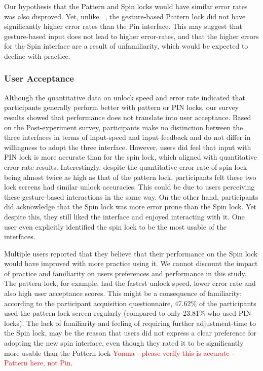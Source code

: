 \documentclass{sigchi}
\newcommand{\comment}[1]{\textcolor{red}{#1}}
\begin{document}
Our hypothesis that the Pattern and Spin locks would have similar error rates was also disproved. Yet, unlike ~\cite{von_zezschwitz_patterns_2013}, the gesture-based Pattern lock did not have significantly higher error rates than the Pin interface. This may suggest that gesture-based input does not lead to higher error-rates, and that the higher errors for the Spin interface are a result of unfamiliarity, which would be expected to decline with practice. 


\subsubsection{User Acceptance}


Although the quantitative data on unlock speed and error rate indicated that participants generally perform better with pattern or PIN locks, our survey results showed that performance does not translate into user acceptance. Based on the Post-experiment survey, participants make no distinction between the three interfaces in terms of input-speed and input feedback and do not differ in willingness to adopt the three interface. However, users did feel that input with PIN lock is more accurate than for the spin lock, which aligned with quantitative error rate results. Interestingly, despite the quantitative error rate of spin lock being almost twice as high as that of the pattern lock, participants felt these two lock screens had similar unlock accuracies. This could be due to users perceiving these gesture-based interactions in the same way. On the other hand, participants did acknowledge that the Spin lock was more error prone than the Spin lock. Yet despite this, they still liked the interface and enjoyed interacting with it. One user even explicitly identified the spin lock to be the most usable of the interfaces. 

Multiple users reported that they believe that their performance on the Spin lock would have improved with more practice using it. We cannot discount the impact of practice and familiarity on users preferences and performance in this study. The pattern lock, for example, had the fastest unlock speed, lower error rate and also high user acceptance scores. This might be a consequence of familiarity: according to the participant acquisition questionnaire, 47.62\% of the participants used the pattern lock screen regularly (compared to only 23.81\% who used PIN locks). The lack of familiarity and feeling of requiring further adjustment-time to the Spin lock, may be the reason that users did not express a clear preference for adopting the new spin interface, even though they rated it to be significantly more usable than the Pattern lock \comment{Yomna - please verify this is accurate - Pattern here, not Pin}. 
\end{document}
